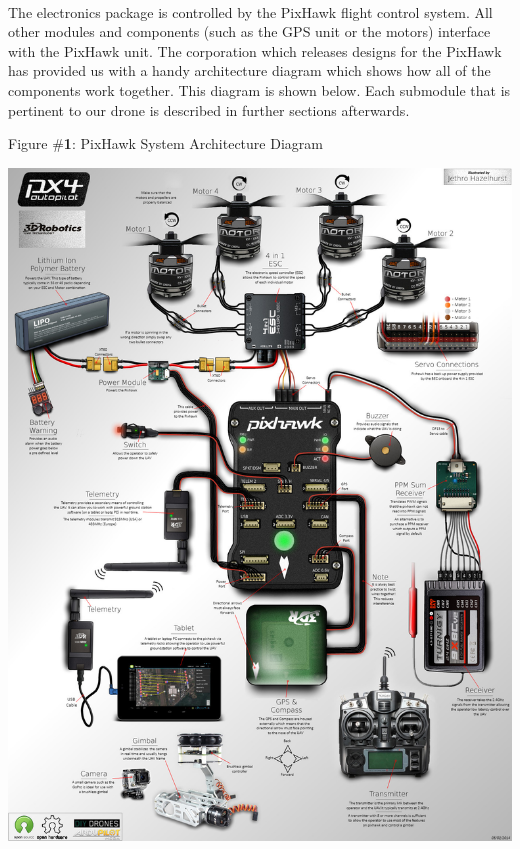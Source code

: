 \documentclass[12pt]{extarticle}
\begin{document}
\ \\
The electronics package is controlled by the PixHawk flight control system.  All other modules and components (such as the GPS unit or the motors) interface with the PixHawk unit.  The corporation which releases designs for the PixHawk has provided us with a handy architecture diagram which shows how all of the components work together.  This diagram is shown below.  Each submodule that is pertinent to our drone is described in further sections afterwards.  

\newpage
\noindent
\begin{center}
    Figure \#\textbf{1}: PixHawk System Architecture Diagram
\end{center}
\begin{center}
    \includegraphics[scale=0.45]{pixhawk.jpg}
\end{center}
\end{document}
